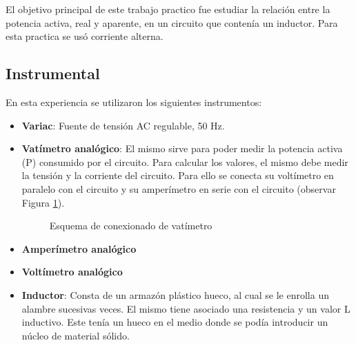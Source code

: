 \documentclass{article}
\begin{document}
        El objetivo principal de este trabajo practico fue estudiar la relación entre la potencia activa, real y aparente, en un circuito que contenía un inductor.
        Para esta practica se usó corriente alterna. 
    

        \subsection{Instrumental}

        En esta experiencia se utilizaron los siguientes instrumentos:

        \begin{itemize}
            \renewcommand{\labelitemi}{$\bullet$}
            \item {\bfseries Variac}: Fuente de tensión AC regulable, 50 Hz.
            \item {\bfseries Vatímetro analógico}: El mismo sirve para poder medir la potencia activa (P) consumido por el circuito.
                    Para calcular los valores, el mismo debe medir la tensión y la corriente del circuito. Para ello se conecta su voltímetro en paralelo con el circuito y su amperímetro en serie con el circuito (observar Figura \ref{fig:vatimetro}). \par

                    \begin{figure}[h!] %
                        \centering
                        \caption{Esquema de conexionado de vatímetro}
                        \label{fig:vatimetro}
                    \end{figure}
            \item {\bfseries Amperímetro analógico}
            \item {\bfseries Voltímetro analógico}
            \item {\bfseries Inductor}: Consta de un armazón plástico hueco, al cual se le enrolla un alambre sucesivas veces. El mismo tiene asociado una resistencia y un valor L inductivo. 
                Este tenía un hueco en el medio donde se podía introducir un núcleo de material sólido. 
        \end{itemize}
        
\end{document}
